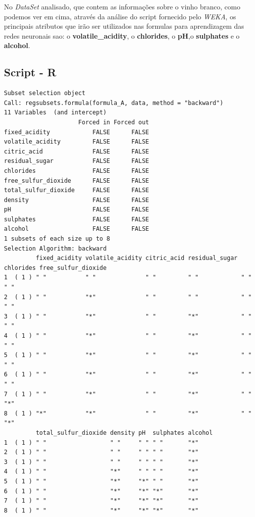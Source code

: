 \documentclass{report}
\begin{document}
No \textit{DataSet} analisado, que contem as informações sobre o vinho branco, como podemos ver em cima, através da análise do script fornecido pelo \textit{WEKA}, os principais atributos que irão ser utilizados nas formulas para aprendizagem das redes neuronais sao: o \textbf{volatile\_acidity}, o \textbf{chlorides}, o \textbf{pH},o \textbf{sulphates} e o \textbf{alcohol}.

\subsection{Script - R}
\begin{verbatim}
Subset selection object
Call: regsubsets.formula(formula_A, data, method = "backward")
11 Variables  (and intercept)
                     Forced in Forced out
fixed_acidity            FALSE      FALSE
volatile_acidity         FALSE      FALSE
citric_acid              FALSE      FALSE
residual_sugar           FALSE      FALSE
chlorides                FALSE      FALSE
free_sulfur_dioxide      FALSE      FALSE
total_sulfur_dioxide     FALSE      FALSE
density                  FALSE      FALSE
pH                       FALSE      FALSE
sulphates                FALSE      FALSE
alcohol                  FALSE      FALSE
1 subsets of each size up to 8
Selection Algorithm: backward
         fixed_acidity volatile_acidity citric_acid residual_sugar chlorides free_sulfur_dioxide
1  ( 1 ) " "           " "              " "         " "            " "       " "                
2  ( 1 ) " "           "*"              " "         " "            " "       " "                
3  ( 1 ) " "           "*"              " "         "*"            " "       " "                
4  ( 1 ) " "           "*"              " "         "*"            " "       " "                
5  ( 1 ) " "           "*"              " "         "*"            " "       " "                
6  ( 1 ) " "           "*"              " "         "*"            " "       " "                
7  ( 1 ) " "           "*"              " "         "*"            " "       "*"                
8  ( 1 ) "*"           "*"              " "         "*"            " "       "*"                
         total_sulfur_dioxide density pH  sulphates alcohol
1  ( 1 ) " "                  " "     " " " "       "*"    
2  ( 1 ) " "                  " "     " " " "       "*"    
3  ( 1 ) " "                  " "     " " " "       "*"    
4  ( 1 ) " "                  "*"     " " " "       "*"    
5  ( 1 ) " "                  "*"     "*" " "       "*"    
6  ( 1 ) " "                  "*"     "*" "*"       "*"    
7  ( 1 ) " "                  "*"     "*" "*"       "*"    
8  ( 1 ) " "                  "*"     "*" "*"       "*"  
\end{verbatim}
\end{document}
